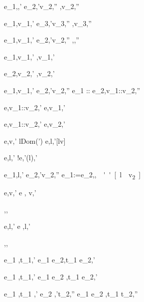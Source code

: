   {e_1,\sigma\eval \True,\sigma'\Quad
   e_2,\sigma'\eval v_2,\sigma''}
  {,\sigma\eval v_2,\sigma''}

  {e_1,\sigma\eval v_1,\sigma' \Quad
   e_3,\sigma'\eval v_3,\sigma''}
  {,\sigma\eval v_3,\sigma''}


  {e_1,\sigma\eval v_1,\sigma' \Quad
   e_2,\sigma'\eval v_2,\sigma''}
  {,\sigma\eval{},\sigma''}

  {e_1,\sigma\eval v_1,\sigma'}
  {\Fst{},\sigma\eval v_1,\sigma'}

  {e_2,\sigma\eval v_2,\sigma'}
  {\Snd{},\sigma\eval v_2,\sigma' }


  {e_1,\sigma\eval v_1,\sigma'\Quad
   e_2,\sigma'\eval v_2,\sigma''}
  {e_1 :: e_2,\sigma\eval v_1::v_2,\sigma''}

  {e,\sigma\eval v_1::v_2,\sigma'}
  {\Head e,\sigma\eval v_1,\sigma'}

{e,\sigma\eval v_1::v_2,\sigma'}
{\Tail e,\sigma\eval v_2,\sigma'}



  {e,\sigma\eval v,\sigma' \Quad
   l\not\in Dom(\sigma')}
  {\Ref e,\sigma\eval l,\sigma'[l\mapsto v]}

  {e,\sigma\eval l,\sigma'}
  {!e,\sigma\eval \sigma'(l),\sigma'}

  {e_1,\sigma\eval l,\sigma' \Quad
   e_2,\sigma'\eval v_2,\sigma''}
  {e_1:=e_2,\sigma\eval \unit,\sigma''[l\mapsto v_2]}

  {e,\sigma \eval v,\sigma'}
  {\Edit e , \sigma\eval \Edit v,\sigma'}

  {}
  {\Enter \tau,\sigma \eval \Enter \tau,\sigma}

  {e,\sigma\eval l,\sigma'}
  {\Update e ,\sigma\eval \Update l,\sigma'}


  {}
  {\Fail,\sigma \eval \Fail,\sigma}


  {e_1 ,\sigma\eval t_1,\sigma'}
  {e_1 \Then e_2,\sigma\eval t_1 \Then e_2,\sigma'}

  {e_1 ,\sigma\eval t_1,\sigma'}
  {e_1 \Next e_2 ,\sigma\eval t_1 \Next e_2,\sigma'}


  {e_1 ,\sigma\eval t_1 ,\sigma'\Quad
   e_2 ,\sigma'\eval t_2,\sigma''}
  {e_1 \And e_2 ,\sigma\eval t_1 \And t_2,\sigma''}


